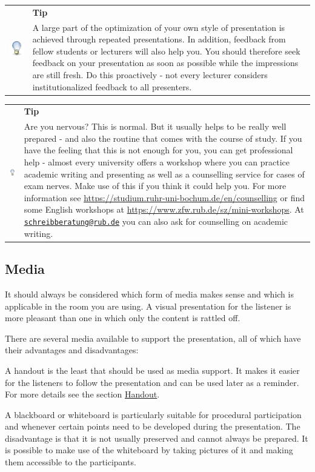 \documentclass[
  english,
]{scrreprt}
\newlength{\iconwidth}
\newenvironment{displaybox}[2]{%
    \begin{center}
        \setlength\arrayrulewidth{0.75pt}%
        \arrayrulecolor{white}%
        \renewcommand{\arraystretch}{1.3}%
        \begin{tabular}{p{\iconwidth}p{\linewidth-4\tabcolsep-\iconwidth}}
            \multirow{2}{*}{#2}&\cellcolor{boxheadcol}\textbf{\sffamily\color{white}#1} \\%
            \hhline{~-}%
            &\cellcolor{boxcol}%
}{%
            \\
        \end{tabular}
        \arrayrulecolor{black}
    \end{center}
}
\newenvironment{Tip}{%
\begin{displaybox}{Tip}{\includegraphics[width=\iconwidth]{images/icon-tipp}}}%
{\end{displaybox}}
\begin{document}
\begin{Tip}

A large part of the optimization of your own style of presentation is achieved through repeated presentations. In addition, feedback from fellow students or lecturers will also help you. You should therefore seek feedback on your presentation as soon as possible while the impressions are still fresh. Do this proactively - not every lecturer considers institutionalized feedback to all presenters.

\end{Tip}

\begin{Tip}

Are you nervous? This is normal. But it usually helps to be really well prepared - and also the routine that comes with the course of study. If you have the feeling that this is not enough for you, you can get professional help - almost every university offers a workshop where you can practice academic writing and presenting as well as a counselling service for cases of exam nerves. Make use of this if you think it could help you. For more information see \url{https://studium.ruhr-uni-bochum.de/en/counselling} or find some English workshops at \url{https://www.zfw.rub.de/sz/mini-workshops}. At \href{mailto:schreibberatung@rub.de}{\nolinkurl{schreibberatung@rub.de}} you can also ask for counselling on academic writing.

\end{Tip}

\subsection{Media}\label{sec:media}

It should always be considered which form of media makes sense and which is applicable in the room you are using. A visual presentation for the listener is more pleasant than one in which only the content is rattled off.

There are several media available to support the presentation, all of which have their advantages and disadvantages:

A handout is the least that should be used as media support. It makes it easier for the listeners to follow the presentation and can be used later as a reminder. For more details see the section \hyperref[sec:handout]{Handout}.

A blackboard or whiteboard is particularly suitable for procedural participation and whenever certain points need to be developed during the presentation. The disadvantage is that it is not usually preserved and cannot always be prepared. It is possible to make use of the whiteboard by taking pictures of it and making them accessible to the participants.
\end{document}
